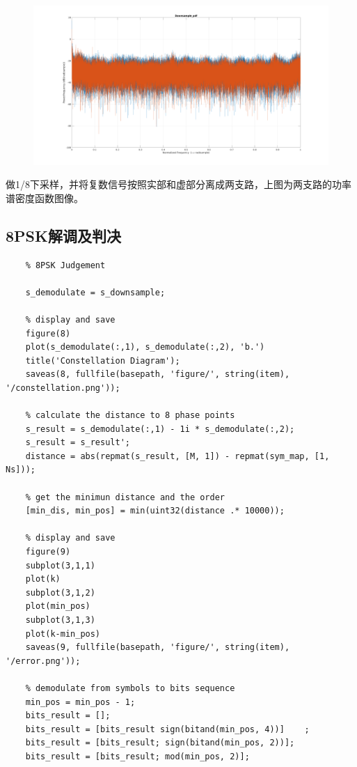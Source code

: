 \begin{spacing}{1.5}
\begin{figure}[H]
\centering
\includegraphics[width = \columnwidth]{downsample.png}
\end{figure}

做1/8下采样，并将复数信号按照实部和虚部分离成两支路，上图为两支路的功率谱密度函数图像。

\subsection{8PSK解调及判决}

\begin{lstlisting}
    % 8PSK Judgement

    s_demodulate = s_downsample;

    % display and save
    figure(8)
    plot(s_demodulate(:,1), s_demodulate(:,2), 'b.')
    title('Constellation Diagram');
    saveas(8, fullfile(basepath, 'figure/', string(item), '/constellation.png'));

    % calculate the distance to 8 phase points
    s_result = s_demodulate(:,1) - 1i * s_demodulate(:,2);
    s_result = s_result';
    distance = abs(repmat(s_result, [M, 1]) - repmat(sym_map, [1, Ns]));

    % get the minimun distance and the order
    [min_dis, min_pos] = min(uint32(distance .* 10000));

    % display and save
    figure(9)
    subplot(3,1,1)
    plot(k)
    subplot(3,1,2)
    plot(min_pos)
    subplot(3,1,3)
    plot(k-min_pos)
    saveas(9, fullfile(basepath, 'figure/', string(item), '/error.png'));

    % demodulate from symbols to bits sequence
    min_pos = min_pos - 1;
    bits_result = [];
    bits_result = [bits_result sign(bitand(min_pos, 4))]    ;
    bits_result = [bits_result; sign(bitand(min_pos, 2))];
    bits_result = [bits_result; mod(min_pos, 2)];


\end{lstlisting}
\end{spacing}
